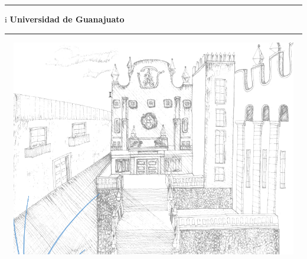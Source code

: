 \documentclass[twocolumn,12pt]{article}
\newcommand{\espacio}[1]{\vspace*{#1\baselineskip}}
\begin{document}
	\begin{titlepage}
	\begin{center}
	    \espacio{1}
		\hrule height 3pt
		\espacio{1}i
		{\Huge \textbf{Universidad de Guanajuato}}\\[0.1cm]
	
		\espacio{0.5}
		\hrule 
	   
		\espacio{4}
		\includegraphics[width=18.0cm,height=9.5cm]{Imagenes/2}
		\vspace{1.6cm}
	    \end{center}

\end{titlepage}
\end{document}
